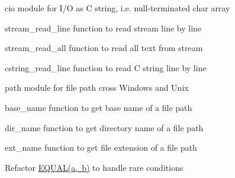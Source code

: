 
\begin{DoxyItemize}
\item {\ttfamily cio} module for I/O as C string, i.\+e. null-\/terminated {\ttfamily char} array
\begin{DoxyItemize}
\item {\ttfamily stream\+\_\+read\+\_\+line} function to read stream line by line
\item {\ttfamily stream\+\_\+read\+\_\+all} function to read all text from stream
\item {\ttfamily cstring\+\_\+read\+\_\+line} function to read C string line by line
\end{DoxyItemize}
\item {\ttfamily path} module for file path cross Windows and Unix
\begin{DoxyItemize}
\item {\ttfamily base\+\_\+name} function to get base name of a file path
\item {\ttfamily dir\+\_\+name} function to get directory name of a file path
\item {\ttfamily ext\+\_\+name} function to get file extension of a file path
\end{DoxyItemize}
\item Refactor {\ttfamily \mbox{\hyperlink{clibs__math_8h_a8eb7da27bde11ccd5bf0c204ad32fb89}{E\+Q\+U\+A\+L(a, b)}}} to handle rare conditions 
\end{DoxyItemize}